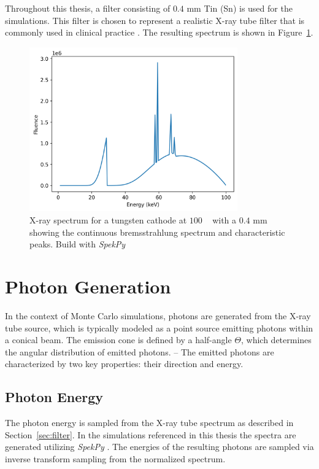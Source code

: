Throughout this thesis, a filter consisting of
$0.4$ \si{\milli\meter} Tin (Sn) is used for the simulations. This filter is chosen to represent a
realistic X-ray tube filter that is commonly used in clinical
practice \cite{steidel2022dose}. The resulting spectrum is shown in
Figure~\ref{fig:spectrum100kvp_with_filter}.

\begin{figure}[H]
    \centering
    \includegraphics[width=0.8\textwidth]{Figures/spectrum_with_filter.png}
    \caption{X-ray spectrum for a tungsten cathode at $100$ \si{\kilo\voltpeak}
    with a $0.4$ \si{\milli\meter} showing the continuous bremsstrahlung
    spectrum and characteristic peaks. Build with \emph{SpekPy} \cite{spekpy}}
    \label{fig:spectrum100kvp_with_filter}
\end{figure}


\section{Photon Generation}

In the context of Monte Carlo simulations, photons are generated from the X-ray
tube source, which is typically modeled as a point source emitting photons
within a conical beam. The emission cone is defined by a half-angle $\Theta$,
which determines the angular distribution of emitted photons. -- The emitted photons are characterized by two key properties: their direction and
energy. 

\subsection*{Photon Energy}
The photon energy is sampled from the X-ray tube spectrum as described in
Section~\ref{sec:filter}. In the simulations referenced in this thesis the
spectra are generated utilizing \emph{SpekPy} \cite{spekpy,
poludniowski2021spekpy}. The energies of the resulting photons are sampled via
inverse transform sampling from the normalized spectrum.

